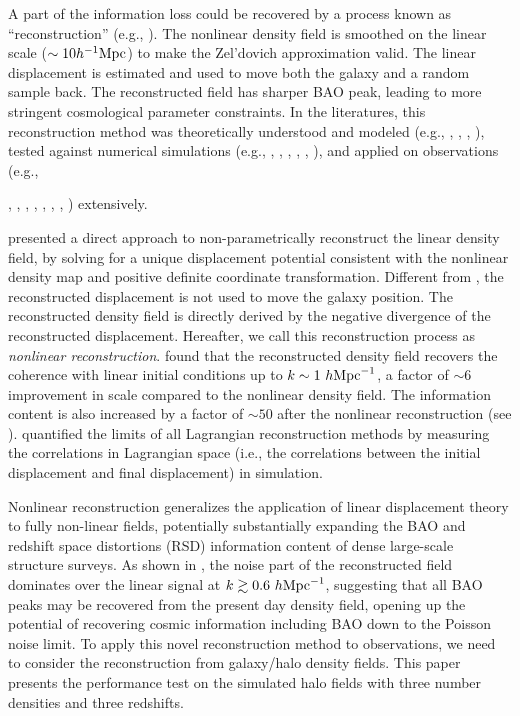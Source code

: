 \documentclass[iop]{emulateapj}
\newcommand{\mpch}{h^{-1} {\rm Mpc}}
\newcommand{\hmpc}{h {\rm Mpc}^{-1}}
\begin{document}
A part of the information loss could be recovered by a process known as ``reconstruction'' (e.g., \citet{Eisenstein07}).
The nonlinear density field is smoothed on the linear scale ($\sim 10 \mpch$) to make the Zel'dovich approximation valid.
The linear displacement is estimated and used to move both the galaxy and a random sample back.
The reconstructed field has sharper BAO peak, leading to more stringent cosmological parameter constraints.
In the literatures, this reconstruction method was theoretically understood and modeled (e.g., \cite{Padmanabhan09}, \cite{Noh09}, \cite{White15}, \cite{Seo16}), tested against numerical simulations (e.g., \cite{Seo08}, \cite{Seo10}, \cite{Mehta11}, \cite{Achitouv15}, \cite{Schmittfull15}, \cite{Obuljen16}), and applied on observations (e.g., {\cite{Padmanabhan12}, \cite{xuxy13}, \cite{Anderson14}, \cite{Kazin14}, \cite{Ross15}, \cite{Beutler16}, \cite{Hinton17}, \cite{Beutler17}) extensively.

\citet{zhuhm16c} presented a direct approach to non-parametrically reconstruct the linear density field,
by solving for a unique displacement potential consistent with the nonlinear density map and positive definite coordinate transformation.
Different from \citet{Eisenstein07}, the reconstructed displacement is not used to move the galaxy position.
The reconstructed density field is directly derived by the negative divergence of the reconstructed displacement.
Hereafter, we call this reconstruction process as {\it nonlinear reconstruction}.
\citet{zhuhm16c} found that the reconstructed density field recovers the coherence with linear initial conditions up to $k\sim 1\ \hmpc$, a factor of $\sim 6$ improvement in scale compared to the nonlinear density field.
The information content is also increased by a factor of $\sim 50$ after the nonlinear reconstruction (see \citet{panqy16}).
\cite{yuhr16} quantified the limits of all Lagrangian reconstruction methods by measuring the correlations in Lagrangian space (i.e., the correlations between the initial displacement and final displacement) in simulation.

Nonlinear reconstruction generalizes the application of linear displacement theory to fully non-linear fields, potentially substantially expanding the BAO and redshift space distortions (RSD) information content of dense large-scale structure surveys.
As shown in \citet{zhuhm16c}, the noise part of the reconstructed field dominates over the linear signal at $k\gtrsim0.6\ \hmpc$, suggesting that all BAO peaks may be recovered from the present day density field, opening up the potential of recovering cosmic information including BAO down to the Poisson noise limit.
To apply this novel reconstruction method to observations, we need to consider the reconstruction from galaxy/halo density fields. 
This paper presents the performance test on the simulated halo fields with three number densities and three redshifts.

}
\end{document}
